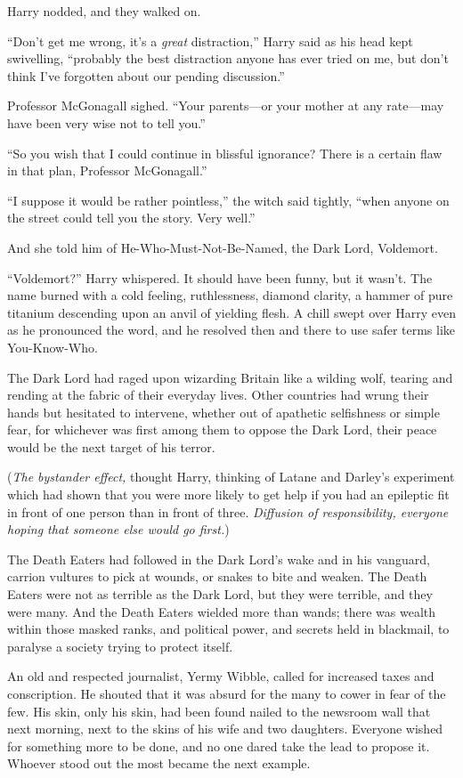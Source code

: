 Harry nodded, and they walked on.

``Don't get me wrong, it's a \emph{great} distraction,'' Harry said as
his head kept swivelling, ``probably the best distraction anyone has
ever tried on me, but don't think I've forgotten about our pending
discussion.''

Professor McGonagall sighed. ``Your parents---or your mother at any
rate---may have been very wise not to tell you.''

``So you wish that I could continue in blissful ignorance? There is a
certain flaw in that plan, Professor McGonagall.''

``I suppose it would be rather pointless,'' the witch said tightly,
``when anyone on the street could tell you the story. Very well.''

And she told him of He-Who-Must-Not-Be-Named, the Dark Lord, Voldemort.

``Voldemort?'' Harry whispered. It should have been funny, but it
wasn't. The name burned with a cold feeling, ruthlessness, diamond
clarity, a hammer of pure titanium descending upon an anvil of yielding
flesh. A chill swept over Harry even as he pronounced the word, and he
resolved then and there to use safer terms like You-Know-Who.

The Dark Lord had raged upon wizarding Britain like a wilding wolf,
tearing and rending at the fabric of their everyday lives. Other
countries had wrung their hands but hesitated to intervene, whether out
of apathetic selfishness or simple fear, for whichever was first among
them to oppose the Dark Lord, their peace would be the next target of
his terror.

(\emph{The bystander effect,} thought Harry, thinking of Latane and
Darley's experiment which had shown that you were more likely to get
help if you had an epileptic fit in front of one person than in front of
three. \emph{Diffusion of responsibility, everyone hoping that someone
else would go first.})

The Death Eaters had followed in the Dark Lord's wake and in his
vanguard, carrion vultures to pick at wounds, or snakes to bite and
weaken. The Death Eaters were not as terrible as the Dark Lord, but they
were terrible, and they were many. And the Death Eaters wielded more
than wands; there was wealth within those masked ranks, and political
power, and secrets held in blackmail, to paralyse a society trying to
protect itself.

An old and respected journalist, Yermy Wibble, called for increased
taxes and conscription. He shouted that it was absurd for the many to
cower in fear of the few. His skin, only his skin, had been found nailed
to the newsroom wall that next morning, next to the skins of his wife
and two daughters. Everyone wished for something more to be done, and no
one dared take the lead to propose it. Whoever stood out the most became
the next example.


